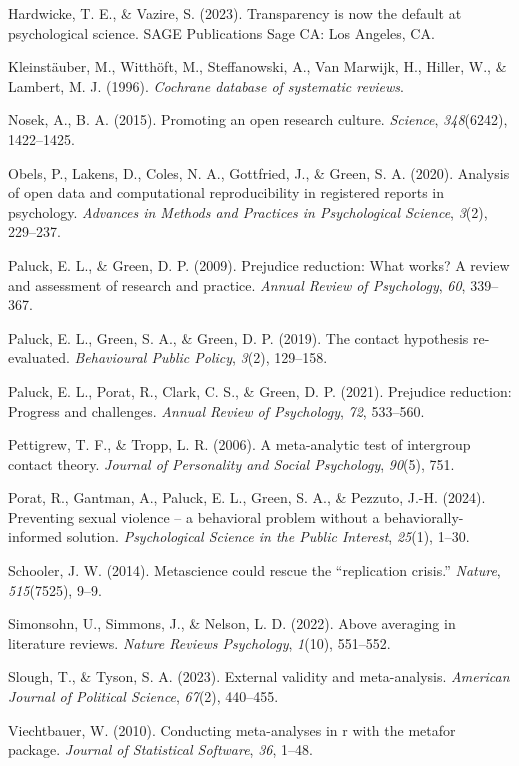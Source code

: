 \documentclass[
  man]{apa6}
\newlength{\cslhangindent}
\newenvironment{CSLReferences}[2] %
 {\begin{list}{}{%
  \setlength{\itemindent}{0pt}
  \setlength{\leftmargin}{0pt}
  \setlength{\parsep}{0pt}
  \ifodd #1
   \setlength{\leftmargin}{\cslhangindent}
   \setlength{\itemindent}{-1\cslhangindent}
  \fi
  \setlength{\itemsep}{#2\baselineskip}}}
 {\end{list}}
\begin{document}
\begin{CSLReferences}{1}{0}
Hardwicke, T. E., \& Vazire, S. (2023). Transparency is now the default at psychological science. SAGE Publications Sage CA: Los Angeles, CA.

Kleinstäuber, M., Witthöft, M., Steffanowski, A., Van Marwijk, H., Hiller, W., \& Lambert, M. J. (1996). \emph{Cochrane database of systematic reviews}.

Nosek, A., B. A. (2015). Promoting an open research culture. \emph{Science}, \emph{348}(6242), 1422--1425.

Obels, P., Lakens, D., Coles, N. A., Gottfried, J., \& Green, S. A. (2020). Analysis of open data and computational reproducibility in registered reports in psychology. \emph{Advances in Methods and Practices in Psychological Science}, \emph{3}(2), 229--237.

Paluck, E. L., \& Green, D. P. (2009). Prejudice reduction: What works? A review and assessment of research and practice. \emph{Annual Review of Psychology}, \emph{60}, 339--367.

Paluck, E. L., Green, S. A., \& Green, D. P. (2019). The contact hypothesis re-evaluated. \emph{Behavioural Public Policy}, \emph{3}(2), 129--158.

Paluck, E. L., Porat, R., Clark, C. S., \& Green, D. P. (2021). Prejudice reduction: Progress and challenges. \emph{Annual Review of Psychology}, \emph{72}, 533--560.

Pettigrew, T. F., \& Tropp, L. R. (2006). A meta-analytic test of intergroup contact theory. \emph{Journal of Personality and Social Psychology}, \emph{90}(5), 751.

Porat, R., Gantman, A., Paluck, E. L., Green, S. A., \& Pezzuto, J.-H. (2024). Preventing sexual violence -- a behavioral problem without a behaviorally-informed solution. \emph{Psychological Science in the Public Interest}, \emph{25}(1), 1--30.

Schooler, J. W. (2014). Metascience could rescue the {``replication crisis.''} \emph{Nature}, \emph{515}(7525), 9--9.

Simonsohn, U., Simmons, J., \& Nelson, L. D. (2022). Above averaging in literature reviews. \emph{Nature Reviews Psychology}, \emph{1}(10), 551--552.

Slough, T., \& Tyson, S. A. (2023). External validity and meta-analysis. \emph{American Journal of Political Science}, \emph{67}(2), 440--455.

Viechtbauer, W. (2010). Conducting meta-analyses in r with the metafor package. \emph{Journal of Statistical Software}, \emph{36}, 1--48.

\end{CSLReferences}
\end{document}
